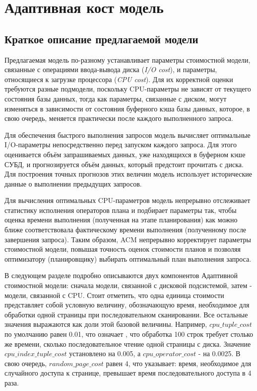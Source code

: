 \chapter{Адаптивная кост модель}\label{ch:ch1}

\section{Краткое описание предлагаемой модели}\label{sec:ch1/sec1}

Предлагаемая модель по-разному устанавливает параметры стоимостной модели, связанные с операциями ввода-вывода диска (\textit{I/O cost}),  и параметры, относящиеся к загрузке процессора (\textit{CPU cost}). Для их корректной оценки требуются разные подмодели, поскольку CPU-параметры не зависят от текущего состояния базы данных, тогда как параметры, связанные с диском, могут изменяться в зависимости от состояния буферного кэша базы данных, которое, в свою очередь, меняется практически после каждого выполненного запроса.

Для обеспечения быстрого выполнения запросов модель вычисляет оптимальные I/O-параметры непосредственно перед запуском каждого запроса. Для этого оценивается объём запрашиваемых данных, уже находящихся в буферном кэше СУБД, и прогнозируется объём данных, который предстоит прочитать с диска. Для построения точных прогнозов этих величин модель использует исторические данные о выполнении предыдущих запросов.


Для вычисления оптимальных CPU-параметров модель непрерывно отслеживает статистику исполнения операторов плана и подбирает параметры так, чтобы оценка времени выполнения (полученная на этапе планирования) как можно ближе соответствовала фактическому времени выполнения (полученному после завершения запроса). Таким образом, ACM непрерывно корректирует параметры стоимостной модели, повышая точность оценок стоимости  планов и позволяя оптимизатору (планировщику) выбирать оптимальный план выполнения запроса.

В следующем разделе подробно описываются двух компонентов Адаптивной стоимостной модели: сначала модели, связанной с дисковой подсистемой, затем - модели, связанной с CPU. Стоит отметить, что одна единица стоимости представляет собой условную величину, обозначающую время, необходимое для обработки одной страницы при последовательном сканировании. Все остальные значения выражаются как доли этой базовой величины. Например, \(cpu\_tuple\_cost\) по умолчанию равен 0.01, что означает , что обработка 100 строк требует столько же времени, сколько последовательное чтение одной страницы с диска.  Значение \(cpu\_index\_tuple\_cost\) установлено на 0.005, а \(cpu\_operator\_cost\) - на 0.0025. В свою очередь, \(random\_page\_cost\) равен 4, что указывает: время, необходимое для случайного доступа к странице, превышает время последовательного доступа в 4 раза.


